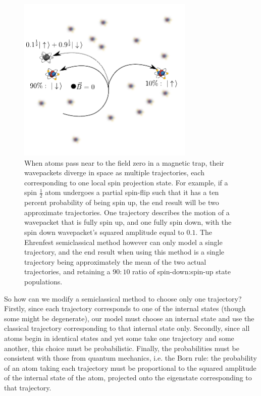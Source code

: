 \begin{figure}[t]
    \centerfloat
    \includegraphics[width=0.75\textwidth]{figures/hidden_variables/evap_problem.pdf}
    \caption{When atoms pass near to the field zero in a magnetic trap, their wavepackets diverge in space as multiple trajectories, each corresponding to one local spin projection state. For example, if a spin $\frac12$ atom undergoes a partial spin-flip such that it has a ten percent probability of being spin up, the end result will be two approximate trajectories. One trajectory describes the motion of a wavepacket that is fully spin up, and one fully spin down, with the spin down wavepacket's squared amplitude equal to $0.1$. The Ehrenfest semiclassical method however can only model a single trajectory, and the end result when using this method is a single trajectory being approximately the mean of the two actual trajectories, and retaining a $90:10$ ratio of spin-down:spin-up state populations.}
    \label{fig:evap_problem}
\end{figure}

So how can we modify a semiclassical method to choose only one trajectory? Firstly, since each trajectory corresponds to one of the internal states (though some might be degenerate), our model must choose an internal state and use the classical trajectory corresponding to that internal state only. Secondly, since all atoms begin in identical states and yet some take one trajectory and some another, this choice must be probabilistic. Finally, the probabilities must be consistent with those from quantum mechanics, i.e. the Born rule: the probability of an atom taking each trajectory must be proportional to the squared amplitude of the internal state of the atom, projected onto the eigenstate corresponding to that trajectory.


